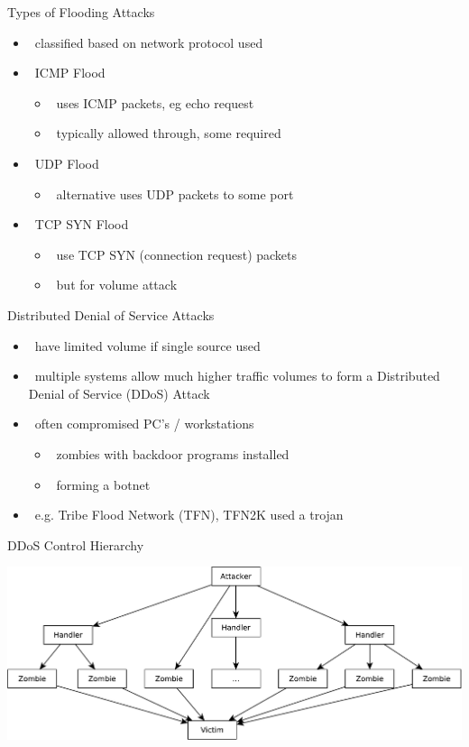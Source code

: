 \documentclass{beamer}
\begin{document}
\begin{frame}{Types of Flooding Attacks }
  \begin{itemize}
  \item  classified based on network protocol used 
  \item  ICMP Flood 
    \begin{itemize}
    \item  uses ICMP packets, eg echo request 
    \item  typically allowed through, some required 
    \end{itemize}
  \item  UDP Flood 
    \begin{itemize}
    \item  alternative uses UDP packets to some port 
    \end{itemize}
  \item  TCP SYN Flood 
    \begin{itemize}
    \item  use TCP SYN (connection request) packets 
    \item  but for volume attack 
    \end{itemize}
  \end{itemize}
\end{frame}

\begin{frame}{Distributed Denial of Service Attacks }
  \begin{itemize}
  \item  have limited volume if single source used 
  \item  multiple systems allow much higher traffic 
    volumes to form a Distributed Denial of 
    Service (DDoS) Attack 
  \item  often compromised PC’s / workstations 
    \begin{itemize}
    \item  zombies with backdoor programs installed 
    \item  forming a botnet 
    \end{itemize}
  \item  e.g. Tribe Flood Network (TFN), TFN2K used a 
    trojan
  \end{itemize}
\end{frame}



\begin{frame}{DDoS Control Hierarchy}
  \begin{center}
    \includegraphics[width=0.8\linewidth]{ddos}
  \end{center}
\end{frame}
\end{document}
